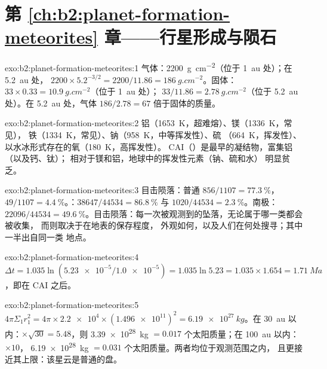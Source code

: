 \section*{第 \ref{ch:b2:planet-formation-meteorites} 章——行星形成与陨石}

\begin{solution}{exo:b2:planet-formation-meteorites:1}
气体：\qty{2200}{g.cm^{-2}}（位于 \qty{1}{au} 处）；在 \qty{5.2}{au} 处，
$2200\times5.2^{-3/2} = 2200/11.86 = \qty{186}{g.cm^{-2}}$。固体：
$33\times0.33 = \qty{10.9}{g.cm^{-2}}$（位于 \qty{1}{au} 处）；
$33/11.86 = \qty{2.78}{g.cm^{-2}}$（位于 \qty{5.2}{au} 处）。在 \qty{5.2}{au} 处，气体
$186/2.78 = 67$ 倍于固体的质量。
\end{solution}

\begin{solution}{exo:b2:planet-formation-meteorites:2}
铝（\qty{1653}{K}，超难熔）、镁（\qty{1336}{K}，常见），
铁（\qty{1334}{K}，常见）、钠（\qty{958}{K}，中等挥发性）、硫
（\qty{664}{K}，挥发性）、以水冰形式存在的氧（\qty{180}{K}，高挥发性）。
CAI（）是最早的凝结物，富集铝（以及钙、钛）；
相对于镁和铝，地球中的挥发性元素（钠、硫和水）
明显贫乏。
\end{solution}

\begin{solution}{exo:b2:planet-formation-meteorites:3}
目击陨落：普通 $856/1107 = \qty{77.3}{\percent}$，
$49/1107 = \qty{4.4}{\percent}$。：$38647/44534 = \qty{86.8}{\percent}$ 与
$1020/44534 = \qty{2.3}{\percent}$。南极：$22096/44534 =
\qty{49.6}{\percent}$。目击陨落：每一次被观测到的坠落，无论属于哪一类都会被收集，
而则取决于在地表的保存程度，
外观如何，以及人们在何处搜寻；其中一半出自同一类
地点。
\end{solution}

\begin{solution}{exo:b2:planet-formation-meteorites:4}
$\Delta t = 1.035\ln(\num{5.23e-5}/\num{1.0e-5}) = 1.035\ln 5.23 =
1.035\times1.654 = \qty{1.71}{Ma}$，即在 CAI 之后。
\end{solution}

\begin{solution}{exo:b2:planet-formation-meteorites:5}
$4\pi\Sigma_1 r_1^2 = 4\pi\times\num{2.2e4}\times(\num{1.496e11})^2 =
\qty{6.19e27}{kg}$。在 \qty{30}{au} 以内：$\times\sqrt{30} = 5.48$，则
\qty{3.39e28}{kg} $= 0.017$ 个太阳质量；在 \qty{100}{au} 以内：$\times10$，
\qty{6.19e28}{kg} $= 0.031$ 个太阳质量。两者均位于观测范围之内，
且更接近其上限：该星云是普通的盘。
\end{solution}

